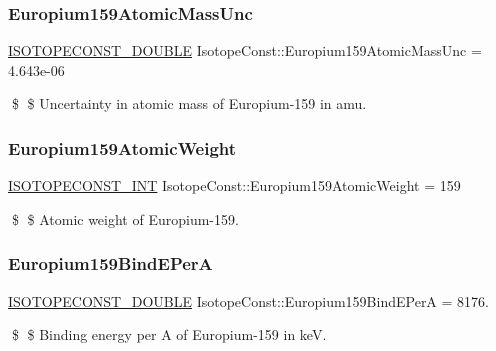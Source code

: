 \subsubsection{\texorpdfstring{Europium159\+Atomic\+Mass\+Unc}{Europium159AtomicMassUnc}}
{\footnotesize\ttfamily \mbox{\hyperlink{group___isotope_const-_macros_ga8f45a7272ce02c0b4c65c44636ed719a}{I\+S\+O\+T\+O\+P\+E\+C\+O\+N\+S\+T\+\_\+\+D\+O\+U\+B\+LE}} Isotope\+Const\+::\+Europium159\+Atomic\+Mass\+Unc = 4.\+643e-\/06}

\$ \$ Uncertainty in atomic mass of Europium-\/159 in amu. \mbox{\label{group___isotope_const-_europium-_eu159_gaf13c5a90840e0a3aa1062e809773c6f7}} 
\subsubsection{\texorpdfstring{Europium159\+Atomic\+Weight}{Europium159AtomicWeight}}
{\footnotesize\ttfamily \mbox{\hyperlink{group___isotope_const-_macros_ga5f18360b3e99483a35c32d789e62621c}{I\+S\+O\+T\+O\+P\+E\+C\+O\+N\+S\+T\+\_\+\+I\+NT}} Isotope\+Const\+::\+Europium159\+Atomic\+Weight = 159}

\$ \$ Atomic weight of Europium-\/159. \mbox{\label{group___isotope_const-_europium-_eu159_ga789073f7a1f401dd12b331e48ac110c2}} 
\subsubsection{\texorpdfstring{Europium159\+Bind\+E\+PerA}{Europium159BindEPerA}}
{\footnotesize\ttfamily \mbox{\hyperlink{group___isotope_const-_macros_ga8f45a7272ce02c0b4c65c44636ed719a}{I\+S\+O\+T\+O\+P\+E\+C\+O\+N\+S\+T\+\_\+\+D\+O\+U\+B\+LE}} Isotope\+Const\+::\+Europium159\+Bind\+E\+PerA = 8176.}

\$ \$ Binding energy per A of Europium-\/159 in keV. \mbox{\label{group___isotope_const-_europium-_eu159_ga4a0a2c7c7184b4494669ac28b3478cc2}} 
